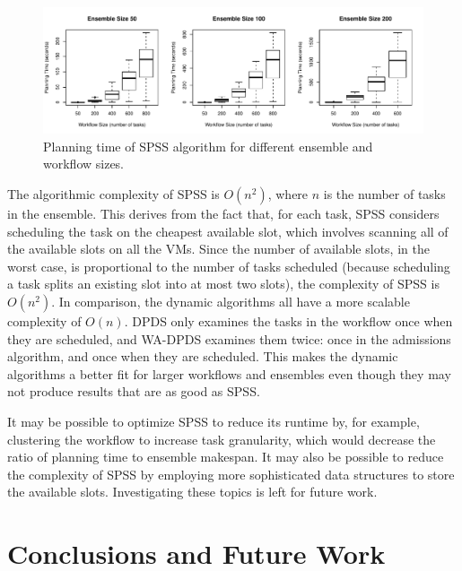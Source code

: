 \documentclass[conference]{IEEEtran}
\begin{document}
\begin{figure}[t]
    \includegraphics[width=\textwidth]{spss_planning_time}
    \caption{Planning time of SPSS algorithm for different ensemble and workflow sizes.}
    \label{fig:spss_planning_time}
\end{figure}

The algorithmic complexity of SPSS is $O(n^2)$, where $n$ is the number of tasks in the ensemble. This derives from the fact that, for each task, SPSS considers scheduling the task on the cheapest available slot, which involves scanning all of the available slots on all the VMs. Since the number of available slots, in the worst case, is proportional to the number of tasks scheduled (because scheduling a task splits an existing slot into at most two slots), the complexity of SPSS is $O(n^2)$. In comparison, the dynamic algorithms all have a more scalable complexity of $O(n)$. DPDS only examines the tasks in the workflow once when they are scheduled, and WA-DPDS examines them twice: once in the admissions algorithm, and once when they are scheduled. This makes the dynamic algorithms a better fit for larger workflows and ensembles even though they may not produce results that are as good as SPSS.

It may be possible to optimize SPSS to reduce its runtime by, for example, clustering the workflow to increase task granularity, which would decrease the ratio of planning time to ensemble makespan. It may also be possible to reduce the complexity of SPSS by employing more sophisticated data structures to store the available slots. Investigating these topics is left for future work.


\section{Conclusions and Future Work}
\label{sec:conclusions}
\end{document}
